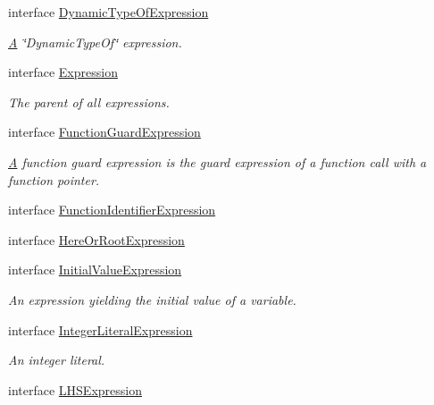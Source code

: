 \begin{DoxyCompactItemize}
interface \hyperlink{interfaceedu_1_1udel_1_1cis_1_1vsl_1_1civl_1_1model_1_1IF_1_1expression_1_1DynamicTypeOfExpression}{Dynamic\+Type\+Of\+Expression}
\begin{DoxyCompactList}\small\item\em \hyperlink{structA}{A} \char`\"{}\+Dynamic\+Type\+Of\char`\"{} expression. \end{DoxyCompactList}\item 
interface \hyperlink{interfaceedu_1_1udel_1_1cis_1_1vsl_1_1civl_1_1model_1_1IF_1_1expression_1_1Expression}{Expression}
\begin{DoxyCompactList}\small\item\em The parent of all expressions. \end{DoxyCompactList}\item 
interface \hyperlink{interfaceedu_1_1udel_1_1cis_1_1vsl_1_1civl_1_1model_1_1IF_1_1expression_1_1FunctionGuardExpression}{Function\+Guard\+Expression}
\begin{DoxyCompactList}\small\item\em \hyperlink{structA}{A} function guard expression is the guard expression of a function call with a function pointer. \end{DoxyCompactList}\item 
interface \hyperlink{interfaceedu_1_1udel_1_1cis_1_1vsl_1_1civl_1_1model_1_1IF_1_1expression_1_1FunctionIdentifierExpression}{Function\+Identifier\+Expression}
\item 
interface \hyperlink{interfaceedu_1_1udel_1_1cis_1_1vsl_1_1civl_1_1model_1_1IF_1_1expression_1_1HereOrRootExpression}{Here\+Or\+Root\+Expression}
\item 
interface \hyperlink{interfaceedu_1_1udel_1_1cis_1_1vsl_1_1civl_1_1model_1_1IF_1_1expression_1_1InitialValueExpression}{Initial\+Value\+Expression}
\begin{DoxyCompactList}\small\item\em An expression yielding the initial value of a variable. \end{DoxyCompactList}\item 
interface \hyperlink{interfaceedu_1_1udel_1_1cis_1_1vsl_1_1civl_1_1model_1_1IF_1_1expression_1_1IntegerLiteralExpression}{Integer\+Literal\+Expression}
\begin{DoxyCompactList}\small\item\em An integer literal. \end{DoxyCompactList}\item 
interface \hyperlink{interfaceedu_1_1udel_1_1cis_1_1vsl_1_1civl_1_1model_1_1IF_1_1expression_1_1LHSExpression}{L\+H\+S\+Expression}

\end{DoxyCompactItemize}
